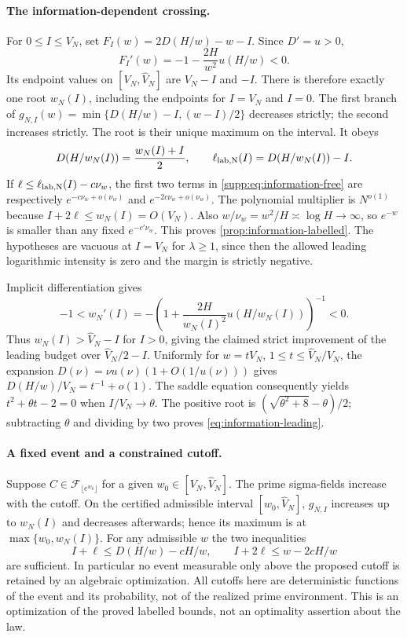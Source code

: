 \paragraph{The information-dependent crossing.}
For $0\le I\le V_N$, set $F_I(w)=2D(H/w)-w-I$. Since $D'=u>0$,
\[
 F_I'(w)=-1-\frac{2H}{w^2}u(H/w)<0.
\]
Its endpoint values on $[V_N,\widehat V_N]$ are $V_N-I$ and $-I$.
There is therefore exactly one root $w_N(I)$, including the endpoints
for $I=V_N$ and $I=0$. The first branch of
$g_{N,I}(w)=\min\{D(H/w)-I,(w-I)/2\}$ decreases strictly; the second
increases strictly. The root is their unique maximum on the interval.
It obeys
\[
 D(H/w_N(I))=\frac{w_N(I)+I}{2},\qquad
 \ell_{\rm lab,N}(I)=D(H/w_N(I))-I.
\]
If $\ell\le\ell_{\rm lab,N}(I)-c\nu_w$, the first two terms in
\eqref{supp:eq:information-free} are respectively
$e^{-c\nu_w+o(\nu_w)}$ and $e^{-2c\nu_w+o(\nu_w)}$.
The polynomial multiplier is $N^{o(1)}$ because
$I+2\ell\le w_N(I)=O(V_N)$. Also $w/\nu_w=w^2/H\asymp\log H\to\infty$,
so $e^{-w}$ is smaller than any fixed $e^{-c'\nu_w}$.
This proves \cref{prop:information-labelled}. The hypotheses are
vacuous at $I=V_N$ for $\lambda\ge1$, since then the allowed leading
logarithmic intensity is zero and the margin is strictly negative.

Implicit differentiation gives
\[
 -1<w_N'(I)=
 -\left(1+\frac{2H}{w_N(I)^2}u(H/w_N(I))\right)^{-1}<0.
\]
Thus $w_N(I)>\widehat V_N-I$ for $I>0$, giving the claimed strict
improvement of the leading budget over $\widehat V_N/2-I$.
Uniformly for $w=tV_N$, $1\le t\le\widehat V_N/V_N$, the expansion
$D(\nu)=\nu u(\nu)(1+O(1/u(\nu)))$ gives
$D(H/w)/V_N=t^{-1}+o(1)$. The saddle equation consequently yields
$t^2+\theta t-2=0$ when $I/V_N\to\theta$.
The positive root is $(\sqrt{\theta^2+8}-\theta)/2$; subtracting
$\theta$ and dividing by two proves \eqref{eq:information-leading}.

\paragraph{A fixed event and a constrained cutoff.}
Suppose $C\in\mathcal F_{\lfloor e^{w_0}\rfloor}$ for a given
$w_0\in[V_N,\widehat V_N]$. The prime sigma-fields increase with the
cutoff. On the certified admissible interval $[w_0,\widehat V_N]$,
$g_{N,I}$ increases up to $w_N(I)$ and decreases afterwards; hence its
maximum is at $\max\{w_0,w_N(I)\}$. For any admissible $w$ the two
inequalities
\[
 I+\ell\le D(H/w)-cH/w,\qquad
 I+2\ell\le w-2cH/w
\]
are sufficient. In particular no event measurable only above the proposed
cutoff is retained by an algebraic optimization. All cutoffs here are
deterministic functions of the event and its probability, not of the
realized prime environment. This is an optimization of the proved
labelled bounds, not an optimality assertion about the law.

